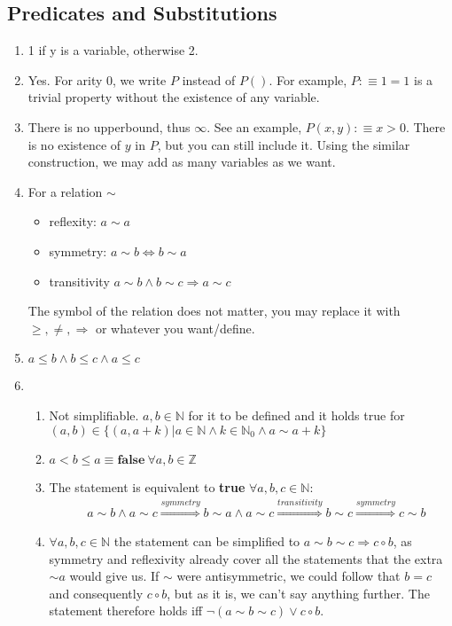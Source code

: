 \documentclass[12pt]{article}
\begin{document}
\subsection*{Predicates and Substitutions}
\begin{enumerate}
    \item 1 if y is a variable, otherwise 2.
    \item Yes. For arity 0, we write $P$ instead of $P()$. 
    For example, $P :\equiv 1 = 1$ is a trivial property without the existence of any variable.
    \item There is no upperbound, thus $\infty$. See an example, $P(x, y) :\equiv x > 0$. 
    There is no existence of $y$ in $P$, but you can still include it. Using the similar 
    construction, we may add as many variables as we want.
    \item For a relation $\sim$
    \begin{itemize}
        \item reflexity: $a \sim a$
        \item symmetry: $a \sim b \iff b \sim a$
        \item transitivity $a \sim b \land b \sim c \Longrightarrow a \sim c$
    \end{itemize}
    The symbol of the relation does not matter, you may replace it with $\geq, \not=, \Longrightarrow$ or whatever you want/define.
    \item $a \leq b \land b \leq c \land a \leq c$
    \item 
    \begin{enumerate}
        \item Not simplifiable. $a, b \in \mathbb{N}$ for it to be defined and it holds true for $(a, b) \in \{(a, a + k) | a \in \mathbb{N} \land k \in \mathbb{N}_0 \land a \sim a + k\}$
        \item $a < b \leq a \equiv \textbf{false}\ \forall a, b \in \mathbb{Z}$
        \item The statement is equivalent to \textbf{true} $\forall a,b,c \in \mathbb{N}$:
        \begin{align*}
            &a \sim b \land a \sim c
            \overset{symmetry}{\Longrightarrow} b \sim a \land a \sim c
            \overset{transitivity}{\Longrightarrow} b \sim c
            \overset{symmetry}{\Longrightarrow} c \sim b
        \end{align*}
        \item $\forall a, b, c \in \mathbb{N}$ the statement can be simplified to $a \sim b \sim c \Longrightarrow c \circ b$, as symmetry and reflexivity already cover all the statements that the extra $\sim a$ would give us. If $\sim$ were antisymmetric, we could follow that $b = c$ and consequently $c \circ b$, but as it is, we can't say anything further. The statement therefore holds iff $\neg(a \sim b \sim c) \lor c \circ b$.

\end{enumerate}
\end{enumerate}
\end{document}
